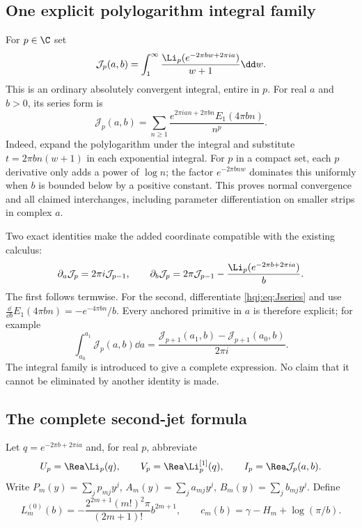 \subsection{One explicit polylogarithm integral family}
For $p\in\C$ set
\begin{equation}\label{hqj:eq:J}
\mathcal J_p(a,b)=\int_1^\infty
\frac{\Li_p(e^{-2\pi bw+2\pi ia})}{w+1}\dd w.
\end{equation}
This is an ordinary absolutely convergent integral, entire in $p$.
For real $a$ and $b>0$, its series form is
\begin{equation}\label{hqj:eq:Jseries}
\mathcal J_p(a,b)=\sum_{n\ge1}
\frac{e^{2\pi ian+2\pi bn}E_1(4\pi bn)}{n^p}.
\end{equation}
Indeed, expand the polylogarithm under the integral and substitute
$t=2\pi bn(w+1)$ in each exponential integral. For $p$ in a compact
set, each $p$ derivative only adds a power of $\log n$; the factor
$e^{-2\pi b n w}$ dominates this uniformly when $b$ is bounded below
by a positive constant. This proves normal convergence and all claimed
interchanges, including parameter differentiation on smaller strips in
complex $a$.

Two exact identities make the added coordinate compatible with the
existing calculus:
\begin{equation}\label{hqj:eq:J-calculus}
\partial_a\mathcal J_p=2\pi i\mathcal J_{p-1},\qquad
\partial_b\mathcal J_p=2\pi\mathcal J_{p-1}
-\frac{\Li_p(e^{-2\pi b+2\pi ia})}{b}.
\end{equation}
The first follows termwise. For the second, differentiate
\eqref{hqj:eq:Jseries} and use
$\frac{\dd}{\dd b}E_1(4\pi bn)=-e^{-4\pi bn}/b$.
Every anchored primitive in $a$ is therefore explicit; for example
\[
\int_{a_0}^{a_1}\mathcal J_p(a,b)\dd a
=\frac{\mathcal J_{p+1}(a_1,b)-\mathcal J_{p+1}(a_0,b)}{2\pi i}.
\]
The integral family is introduced to give a complete expression. No
claim that it cannot be eliminated by another identity is made.

\subsection{The complete second-jet formula}
Let $q=e^{-2\pi b+2\pi ia}$ and, for real $p$, abbreviate
\[
U_p=\Rea\Li_p(q),\qquad V_p=\Rea\Li_p^{[1]}(q),\qquad
I_p=\Rea\mathcal J_p(a,b).
\]
Write $P_m(y)=\sum_jp_{mj}y^j$, $A_m(y)=\sum_ja_{mj}y^j$,
$B_m(y)=\sum_jb_{mj}y^j$. Define
\begin{equation}\label{hqj:eq:Lzero}
L_m^{(0)}(b)=-\frac{2^{2m+1}(m!)^2\pi}{(2m+1)!}b^{2m+1},
\qquad c_m(b)=\gamma-H_m+\log(\pi/b).
\end{equation}

